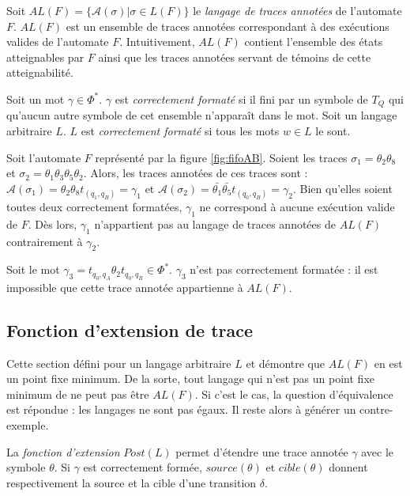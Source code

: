 Soit $AL(F)=\{\mathcal{A}(\sigma)|\sigma \in L(F)\}$ le \emph{langage de traces annotées} de l'automate $F$. $AL(F)$ est un ensemble de traces annotées correspondant à des exécutions valides de l'automate $F$. Intuitivement, $AL(F)$ contient l'ensemble des états atteignables par $F$ ainsi que les traces annotées servant de témoins de cette atteignabilité.

Soit un mot $\gamma \in \Phi^*$. $\gamma$ est \emph{correctement formaté} si il fini par un symbole de $T_Q$ qui qu'aucun autre symbole de cet ensemble n'apparaît dans le mot. Soit un langage arbitraire $L$. $L$ est \emph{correctement formaté} si tous les mots $w\in L$ le sont.


\begin{example}
Soit l'automate $F$ représenté par la figure \ref{fig:fifoAB}. Soient les traces $\sigma_1=\theta_2\theta_8$ et $\sigma_2=\theta_1\theta_3\theta_5\theta_2$. Alors, les traces annotées de ces traces sont : $\mathcal{A}(\sigma_1)=\theta_2\theta_8t_{(q_1,q_B)}=\gamma_1$ et $\mathcal{A}(\sigma_2)=\bar{\theta_1}\bar{\theta_5}t_{(q_0,q_B)}=\gamma_2$.
Bien qu'elles soient toutes deux correctement formatées, $\gamma_1$ ne correspond à aucune exécution valide de $F$. Dès lors, $\gamma_1$ n'appartient pas au langage de traces annotées de $AL(F)$ contrairement à $\gamma_2$.

Soit le mot $\gamma_3=t_{q_0,q_A}\theta_2 t_{q_0,q_B} \in \Phi^*$. $\gamma_3$ n'est pas correctement formatée : il est impossible que cette trace annotée appartienne à $AL(F)$.
\end{example}


\subsection{Fonction d'extension de trace}\label{ss:extension}

Cette section défini \fl pour un langage arbitraire $L$ et démontre que $AL(F)$ en est un point fixe minimum. De la sorte, tout langage qui n'est pas un point fixe minimum de \fl ne peut pas être $AL(F)$. Si c'est le cas, la question d'équivalence est répondue : les langages ne sont pas égaux. Il reste alors à générer un contre-exemple.

La \emph{fonction d'extension} $Post(L)$ permet d'étendre une trace annotée $\gamma$ avec le symbole $\theta$. Si $\gamma$ est correctement formée, $source(\theta)$ et $cible(\theta)$ donnent respectivement la source et la cible d'une transition $\delta$.

